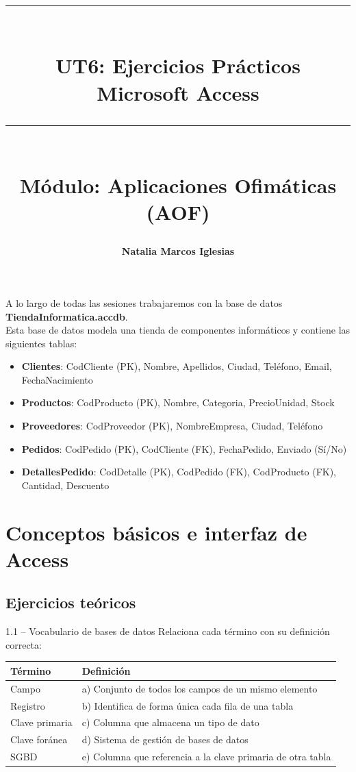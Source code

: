 \documentclass[12pt,a4paper]{article}
\title{
  \vspace{-1cm}
  {\color{accessred}\rule{\linewidth}{3pt}}\\[0.3cm]
  {\Huge\bfseries\color{accessred} UT6: Ejercicios Prácticos\\[0.2cm]
  Microsoft Access}\\[0.3cm]
  {\color{accessred}\rule{\linewidth}{1pt}}\\[0.2cm]
  {\large\color{gray} Módulo: Aplicaciones Ofimáticas (AOF)}
}
\author{\textbf{Natalia Marcos Iglesias}}
\date{}
\begin{document}
\maketitle
\thispagestyle{empty}

\begin{tcolorbox}[colback=noteblue, colframe=darkblue, title=\textbf{Base de datos del curso: ``Tienda Informática''}]
A lo largo de todas las sesiones trabajaremos con la base de datos \textbf{TiendaInformatica.accdb}.\\
Esta base de datos modela una tienda de componentes informáticos y contiene las siguientes tablas:

\begin{itemize}
  \item \textbf{Clientes}: CodCliente (PK), Nombre, Apellidos, Ciudad, Teléfono, Email, FechaNacimiento
  \item \textbf{Productos}: CodProducto (PK), Nombre, Categoria, PrecioUnidad, Stock
  \item \textbf{Proveedores}: CodProveedor (PK), NombreEmpresa, Ciudad, Teléfono
  \item \textbf{Pedidos}: CodPedido (PK), CodCliente (FK), FechaPedido, Enviado (Sí/No)
  \item \textbf{DetallesPedido}: CodDetalle (PK), CodPedido (FK), CodProducto (FK), Cantidad, Descuento
\end{itemize}
\end{tcolorbox}

\tableofcontents
\newpage

\section{Conceptos básicos e interfaz de Access}

\subsection{Ejercicios teóricos}

\begin{ejercicio}{1.1 -- Vocabulario de bases de datos}
Relaciona cada término con su definición correcta:

\begin{center}
\renewcommand{\arraystretch}{1.4}
\begin{tabular}{p{4cm} | p{7cm}}
\textbf{Término} & \textbf{Definición} \\
\hline
Campo & a) Conjunto de todos los campos de un mismo elemento \\
Registro & b) Identifica de forma única cada fila de una tabla \\
Clave primaria & c) Columna que almacena un tipo de dato \\
Clave foránea & d) Sistema de gestión de bases de datos \\
SGBD & e) Columna que referencia a la clave primaria de otra tabla \\
\end{tabular}
\end{center}
\end{ejercicio}
\end{document}
